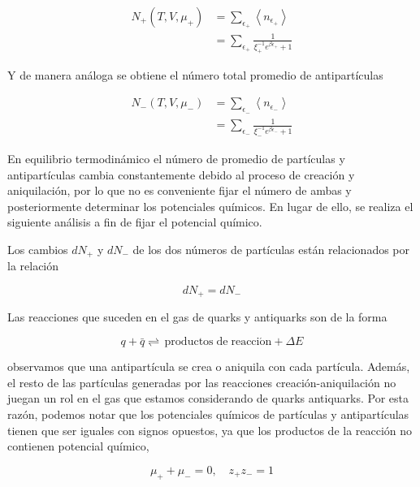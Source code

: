\begin{equation}\label{eq-FD-Tot-Numb-Parts}
\begin{split}
{N}_{+}(T,V,{\mu}_{+}) &= \sum_{{\epsilon}_{+}} \left\langle{n}_{{\epsilon}_{+}} \right\rangle\\
& = \sum_{{\epsilon}_{+}} \frac{1}{{\xi}_{+}^{-1}{e}^{\beta{{\epsilon}}_{+}} + 1}
\end{split}
\end{equation}

Y de manera análoga se obtiene el número total promedio de antipartículas

\begin{equation}\label{eq-FD-Tot-Numb-Antiparts}
\begin{split}
{N}_{-}(T,V,{\mu}_{-}) &= \sum_{{\epsilon}_{-}} \left\langle{n}_{{\epsilon}_{-}} \right\rangle\\
& = \sum_{{\epsilon}_{-}} \frac{1}{{\xi}_{-}^{-1}{e}^{\beta{{\epsilon}}_{-}} + 1}
\end{split}
\end{equation}

En equilibrio termodinámico el número de promedio de partículas y antipartículas cambia constantemente debido al proceso de creación y aniquilación, por lo que no es conveniente fijar el número de ambas y posteriormente determinar los potenciales químicos. En lugar de ello, se realiza el siguiente análisis a fin de fijar el potencial químico.

Los cambios $d{N}_{+}$ y $d{N}_{-}$ de los dos números de partículas están relacionados por la relación

$$
d{N}_{+} = d{N}_{-}
$$

Las reacciones que suceden en el gas de quarks y antiquarks son de la forma

$$
q + \bar{q} \rightleftharpoons \, \mathrm{productos \; de \; reacci\acute{o}n} + \Delta E
$$

observamos que una antipartícula se crea o aniquila con cada partícula. Además, el resto de las partículas generadas por las reacciones creación-aniquilación no juegan un rol en el gas que estamos considerando de quarks antiquarks. Por esta razón, podemos notar que los potenciales químicos de partículas y antipartículas tienen que ser iguales con signos opuestos, ya que los productos de la reacción no contienen potencial químico,

\begin{equation}\label{eq-FD-chpot-fug}
{\mu}_{+} + {\mu}_{-} = 0, \quad {z}_{+}{z}_{-}=1
\end{equation}

